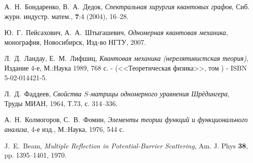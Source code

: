 \documentclass[a4 paper, 12 pt]{extarticle}
\newcommand{\RomanNumeralCaps}[1]
{\MakeUppercase{\romannumeral #1}}
\begin{document}
\begin{thebibliography}{1}
	 А.~Н.~Бондаренко, В.~А.~Дедок, {\it Спектральная хирургия квантовых графов}, Сиб. журн. индустр. матем., \textbf{7}:4 (2004), 16--28.
	
	 Ю.~Г.~Пейсахович, А.~А.~Штыгашевич, {\it Одномерная квантовая механика}, монография, Новосибирск, Изд-во НГТУ, 2007.
	
	 Л.~Д.~Ландау, Е.~М.~Лифшиц, {\it Квантовая механика (нерелятивистская теория)}, Издание 4-е, М.:Наука 1989, 768 с. - (<<Теоретическая физика>>, том \RomanNumeralCaps{3}) - ISBN 5-02-014421-5.
	
	 Л.~Д.~Фаддеев, {\it Свойства $S$-матрицы одномерного уравнения Шрёдингера}, Труды МИАН, 1964, Т.73, с. 314--336.
	
	 А.~Н.~Колмогоров, С.~В.~Фомин, {\it Элементы теории функций и функционального анализа}, 4-е изд., М.:Наука, 1976, 544 с.
	
	 J.~E.~Beam, {\it Multiple Reflection in Potential-Barrier Scattering}, Am. J. Phys \textbf{38}, pp. 1395--1401, 1970.
	
	
	
\end{thebibliography}
\end{document}
